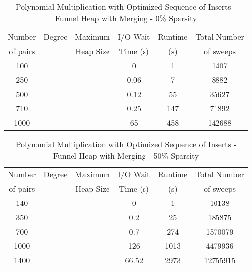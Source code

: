 \documentclass[11pt, one-sided]{amsart}
\begin{document}
\begin{table}[htbp]
   \centering
      \caption{Polynomial Multiplication with Optimized Sequence of Inserts - Funnel Heap with Merging - 0\% Sparsity}
   \begin{tabular}{|c|c|c|c|c|c|}
   	\hline
		 Number   & 	Degree	& Maximum 	& I/O Wait		&  Runtime 	& Total Number		 \\ 
		 of pairs 	&			& Heap Size	& Time (s)		&	(s)	 	& of sweeps			\\ \hline
		 100		&			&			&	0		&	1		&	1407				\\
		 250		&			&			&	0.06		&	7		&	8882				\\
		 500		&			&			&	0.12		&	55		&	35627			\\
		 710		&			&			&	0.25		&	147		&	71892			\\
		1000		&			&			&	65		&	458		&	142688			\\
	\hline
   \end{tabular}
   \label{tab:booktabs}
\end{table}

\begin{table}[htbp]
   \centering
      \caption{Polynomial Multiplication with Optimized Sequence of Inserts - Funnel Heap with Merging - 50\% Sparsity}
   \begin{tabular}{|c|c|c|c|c|c|}
   	\hline
		 Number   & 	Degree	& Maximum 	& I/O Wait		&  Runtime 	& Total Number	\\ 
		 of pairs 	&			& Heap Size	& Time (s)		&	(s)	 	& of sweeps		\\ \hline
		 140		&			&			&	0		&	1		&	10138		\\
		 350		&			&			&	0.2		&	25		&	185875		\\
		 700		&			&			&	0.7		&	274		&	1570079		\\
		1000		&			&			&	126		&	1013		&	4479936		\\
		1400		&			&			&	66.52	&	2973		&	12755915		\\
	\hline
   \end{tabular}
   \label{tab:booktabs}
\end{table}
\end{document}
